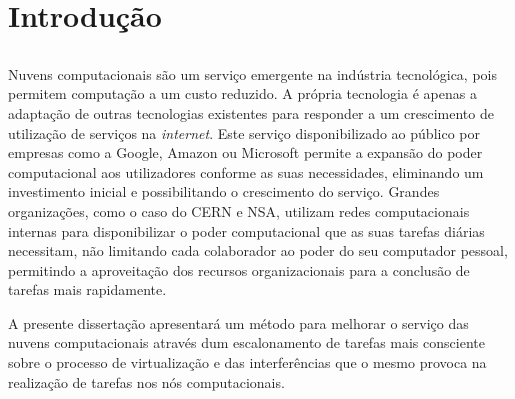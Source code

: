 \chapter{Introdução} \label{chap:intro}

\section*{}

Nuvens computacionais são um serviço emergente na indústria tecnológica, pois permitem computação a um custo reduzido. A própria tecnologia é apenas a adaptação de outras tecnologias existentes para responder a um crescimento de utilização de serviços na \textit{internet}. Este serviço disponibilizado ao público por empresas como a Google, Amazon ou Microsoft permite a expansão do poder computacional aos utilizadores conforme as suas necessidades, eliminando um investimento inicial e possibilitando o crescimento do serviço. Grandes organizações, como o caso do CERN e NSA, utilizam redes computacionais internas para disponibilizar o poder computacional que as suas tarefas diárias necessitam, não limitando cada colaborador ao poder do seu computador pessoal, permitindo a aproveitação dos recursos organizacionais para a conclusão de tarefas mais rapidamente. 

A presente dissertação apresentará um método para melhorar o serviço das nuvens computacionais através dum escalonamento de tarefas mais consciente sobre o processo de virtualização e das interferências que o mesmo provoca na realização de tarefas nos nós computacionais.





